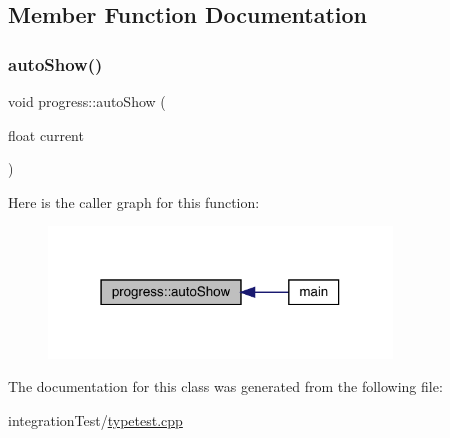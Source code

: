 \subsection{Member Function Documentation}
\mbox{\label{classprogress_a9abf6cad4ec787f0f886469b3fac058a}} 
\subsubsection{\texorpdfstring{auto\+Show()}{autoShow()}}
{\footnotesize\ttfamily void progress\+::auto\+Show (\begin{DoxyParamCaption}\item[{float}]{current }\end{DoxyParamCaption})\hspace{0.3cm}{\ttfamily [inline]}}

Here is the caller graph for this function\+:
\nopagebreak
\begin{figure}[H]
\begin{center}
\leavevmode
\includegraphics[width=259pt]{classprogress_a9abf6cad4ec787f0f886469b3fac058a_icgraph}
\end{center}
\end{figure}


The documentation for this class was generated from the following file\+:\begin{DoxyCompactItemize}
\item 
integration\+Test/\mbox{\hyperlink{typetest_8cpp}{typetest.\+cpp}}\end{DoxyCompactItemize}
